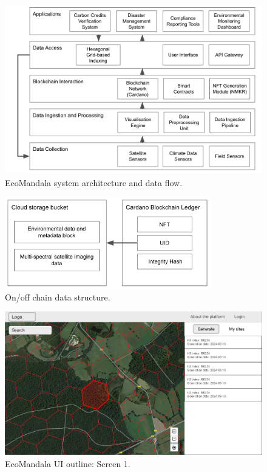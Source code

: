 \documentclass{scrreport}
\begin{document}
\begin{figure}[H]
\centering
\includegraphics[width=\textwidth]{Images/ecomandala-20240912-1.png}
\caption{EcoMandala system architecture and data flow.}
\label{fig:components_diagram}
\end{figure}

\begin{figure}[H]
    \centering
    \includegraphics[width=0.8\textwidth]{Images/ecomandala-data-20240913-1.png}
    \caption{On/off chain data structure.}
    \label{fig:data-structure}
\end{figure}

\begin{figure}[H]
\centering
\includegraphics[width=\textwidth]{Images/screen1-20240913-1.png}
\caption{EcoMandala UI outline: Screen 1.}
\label{fig:ui-screen-1}
\end{figure}
\end{document}
